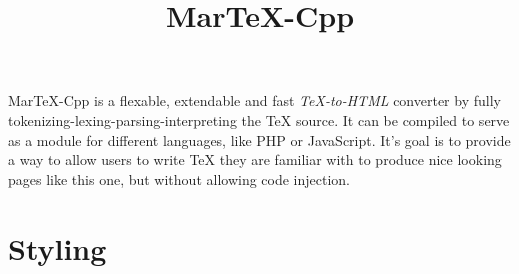 \begin{page}
%
%
\newcommand\descriptor[2]{
\textbf{#1}
\begin{paragraph}#2\end{paragraph}%
}%
%

\title{MarTeX-Cpp}\hline
		MarTeX-Cpp is a flexable, extendable and fast \textit{TeX-to-HTML} converter by fully tokenizing-lexing-parsing-interpreting the TeX source. It can be compiled to serve as a module for different languages, like PHP or JavaScript. It's goal is to provide a way to allow users to write TeX they are familiar with to produce nice looking pages like this one, but without allowing code injection.
        
\section{Styling}


\end{page}
